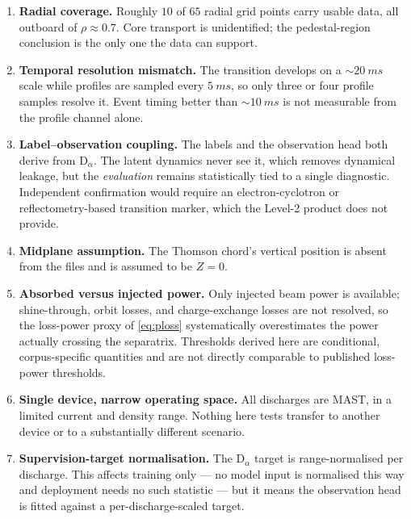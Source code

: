 \begin{enumerate}
\item \textbf{Radial coverage.} Roughly $10$ of $65$ radial grid points
carry usable data, all outboard of $\rho \approx 0.7$. Core transport is
unidentified; the pedestal-region conclusion is the only one the data can
support.
\item \textbf{Temporal resolution mismatch.} The transition develops on a
$\sim$$\SI{20}{ms}$ scale while profiles are sampled every $\SI{5}{ms}$, so
only three or four profile samples resolve it. Event timing better than
$\sim$$\SI{10}{ms}$ is not measurable from the profile channel alone.
\item \textbf{Label--observation coupling.} The labels and the observation
head both derive from D$_\alpha$. The latent dynamics never see it, which
removes dynamical leakage, but the \emph{evaluation} remains statistically
tied to a single diagnostic. Independent confirmation would require an
electron-cyclotron or reflectometry-based transition marker, which the
Level-2 product does not provide.
\item \textbf{Midplane assumption.} The Thomson chord's vertical position is
absent from the files and is assumed to be $Z = 0$.
\item \textbf{Absorbed versus injected power.} Only injected beam power is
available; shine-through, orbit losses, and charge-exchange losses are not
resolved, so the loss-power proxy of \eqref{eq:ploss} systematically
overestimates the power actually crossing the separatrix. Thresholds derived
here are conditional, corpus-specific quantities and are not directly
comparable to published loss-power thresholds.
\item \textbf{Single device, narrow operating space.} All discharges are
MAST, in a limited current and density range. Nothing here tests transfer to
another device or to a substantially different scenario.
\item \textbf{Supervision-target normalisation.} The D$_\alpha$ target is
range-normalised per discharge. This affects training only --- no model input
is normalised this way and deployment needs no such statistic --- but it
means the observation head is fitted against a per-discharge-scaled target.
\end{enumerate}
